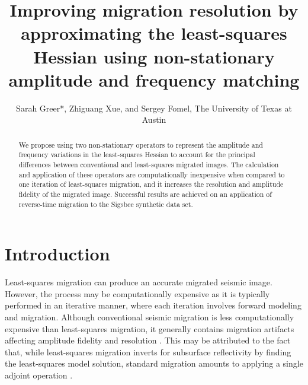 \title{Improving migration resolution by approximating the least-squares Hessian using non-stationary amplitude and frequency matching}

\usetikzlibrary{arrows,automata}
\author{Sarah Greer*, Zhiguang Xue, and Sergey Fomel, The University of Texas at Austin}
\relax{}

\newcommand*{\tran}{^{\mkern-1.5mu\mathsf{T}}}
\maketitle
{}
\begin{abstract}
    We propose using two non-stationary operators to represent the amplitude and frequency variations in the least-squares Hessian to account for the principal differences between conventional and least-squares migrated images.
    The calculation and application of these operators are computationally inexpensive when compared to one iteration of least-squares migration, and it increases the resolution and amplitude fidelity of the migrated image.
    Successful results are achieved on an application of reverse-time migration to the Sigsbee synthetic data set.
\end{abstract}

\section{Introduction}
    Least-squares migration can produce an accurate migrated seismic image.
    However, the process may be computationally expensive as it is typically performed in an iterative manner, where each iteration involves forward modeling and migration. 
    Although conventional seismic migration is less computationally expensive than least-squares migration, it generally contains migration artifacts affecting amplitude fidelity and resolution \cite[]{lsamp,pwlsrtm}.
    This may be attributed to the fact that, while least-squares migration inverts for subsurface reflectivity by finding the least-squares model solution, standard migration amounts to applying a single adjoint operation \cite[]{pvi}. 


